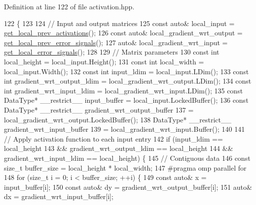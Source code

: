 Definition at line 122 of file activation.\+hpp.


\begin{DoxyCode}
122                                 \{
123 
124     \textcolor{comment}{// Input and output matrices}
125     \textcolor{keyword}{const} \textcolor{keyword}{auto}& local\_input = \hyperlink{classlbann_1_1Layer_a35397843bb0c84030000c7d872229acb}{get\_local\_prev\_activations}();
126     \textcolor{keyword}{const} \textcolor{keyword}{auto}& local\_gradient\_wrt\_output = \hyperlink{classlbann_1_1Layer_a82827edc5e869960144f3ccb2172bfcd}{get\_local\_prev\_error\_signals}();
127     \textcolor{keyword}{auto}& local\_gradient\_wrt\_input = \hyperlink{classlbann_1_1Layer_af178d00b9d878aa7d87754bff2a91f3a}{get\_local\_error\_signals}();
128 
129     \textcolor{comment}{// Matrix parameters}
130     \textcolor{keyword}{const} \textcolor{keywordtype}{int} local\_height = local\_input.Height();
131     \textcolor{keyword}{const} \textcolor{keywordtype}{int} local\_width = local\_input.Width();
132     \textcolor{keyword}{const} \textcolor{keywordtype}{int} input\_ldim = local\_input.LDim();
133     \textcolor{keyword}{const} \textcolor{keywordtype}{int} gradient\_wrt\_output\_ldim = local\_gradient\_wrt\_output.LDim();
134     \textcolor{keyword}{const} \textcolor{keywordtype}{int} gradient\_wrt\_input\_ldim = local\_gradient\_wrt\_input.LDim();
135     \textcolor{keyword}{const} DataType* \_\_restrict\_\_ input\_buffer = local\_input.LockedBuffer();
136     \textcolor{keyword}{const} DataType* \_\_restrict\_\_ gradient\_wrt\_output\_buffer
137       = local\_gradient\_wrt\_output.LockedBuffer();
138     DataType* \_\_restrict\_\_ gradient\_wrt\_input\_buffer
139       = local\_gradient\_wrt\_input.Buffer();
140 
141     \textcolor{comment}{// Apply activation function to each input entry}
142     \textcolor{keywordflow}{if} (input\_ldim == local\_height
143         && gradient\_wrt\_output\_ldim == local\_height
144         && gradient\_wrt\_input\_ldim == local\_height) \{
145       \textcolor{comment}{// Contiguous data}
146       \textcolor{keyword}{const} \textcolor{keywordtype}{size\_t} buffer\_size = local\_height * local\_width;
147 \textcolor{preprocessor}{      #pragma omp parallel for}
148       \textcolor{keywordflow}{for} (\textcolor{keywordtype}{size\_t} i = 0; i < buffer\_size; ++i) \{
149         \textcolor{keyword}{const} \textcolor{keyword}{auto}& x = input\_buffer[i];
150         \textcolor{keyword}{const} \textcolor{keyword}{auto}& dy = gradient\_wrt\_output\_buffer[i];
151         \textcolor{keyword}{auto}& dx = gradient\_wrt\_input\_buffer[i];

\end{DoxyCode}

